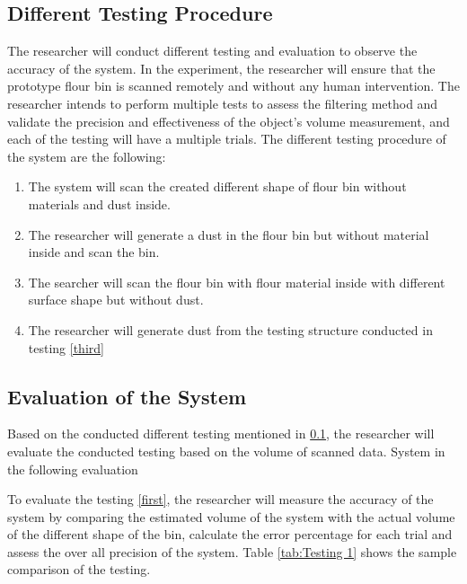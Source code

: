 \subsection{Different Testing Procedure}
\label{method:subsec:Different Testing Procedure}
The researcher will conduct different testing and evaluation to observe the accuracy of the system. In the experiment, the researcher will ensure that the prototype flour bin is scanned remotely and without any human intervention. The researcher intends to perform multiple tests to assess the filtering method and validate the precision and effectiveness of the object's volume measurement, and each of the testing will have a multiple trials. The different testing procedure of the system are the following:
\begin{enumerate}
    \item \label{first} The system will scan the created different shape of flour bin without materials and dust inside.
    \item \label{second} The researcher will generate a dust in the flour bin but without material inside and scan the bin.
    \item \label{third} The searcher will scan the flour bin with flour material inside with different surface shape but without dust.
    \item \label{fourth} The researcher will generate dust from the testing structure conducted in testing \ref{third}
\end{enumerate}

\subsection{Evaluation of the System}
\label{method:subsec:Evaluation of the System}
Based on the conducted different testing mentioned in \ref{method:subsec:Different Testing Procedure}, the researcher will evaluate the conducted testing based on the volume of scanned data. System in the following evaluation

To evaluate the testing \ref{first}, the researcher will measure the accuracy of the system by comparing the estimated volume of the system  with the actual volume of the different shape of the bin, calculate the error percentage for each trial and assess the over all precision of the system. Table \ref{tab:Testing 1} shows the sample comparison of the testing.

